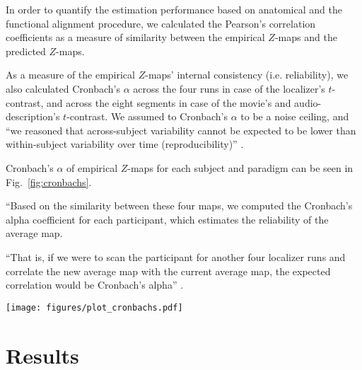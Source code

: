In order to quantify the estimation performance based on anatomical and the
functional alignment procedure, we calculated the Pearson's correlation
coefficients as a measure of similarity between the empirical $Z$-maps and the
predicted $Z$-maps.

As a measure of the empirical $Z$-maps' internal consistency (i.e.
reliability), we also calculated Cronbach's $\alpha$ across the four runs in
case of the localizer's $t$-contrast, and across the eight segments in case of
the movie's and audio-description's $t$-contrast.
%
We assumed to Cronbach's $\alpha$ to be a noise ceiling, and ``we reasoned that
across-subject variability cannot be expected to be lower than within-subject
variability over time (reproducibility)'' \citep{rosenke2021probabilistic}.


%
Cronbach's $\alpha$ of empirical $Z$-maps for each subject and paradigm
can be seen in Fig.~\ref{fig:cronbachs}.

``Based on the similarity between these four maps, we computed the Cronbach's
alpha coefficient for each participant, which estimates the reliability of the
average map.

%
\citep{feilong2022individualized} ``That is, if we were to scan the participant
for another four localizer runs and correlate the new average map with the
current average map, the expected correlation would be Cronbach's alpha''
\citep{feilong2022individualized}.



\begin{figure*}[tbp] \centering
    \texttt{[image: figures/plot\_cronbachs.pdf]}
    \caption{\textbf{Cronbach's $\alpha$ of the empirical $Z$-maps for each
    paradigm and subject.}
    Cronbach's $\alpha$ was calculated based on the $Z$-maps yielded by the
    first level \ac{glm} analyses of the visual localizer
    \citep{sengupta2016extension} (four runs) and naturalistic stimuli
    \citep{haeusler2022processing} (eight segments each) respectively.
    The second-level \ac{glm} analyses across runs / segments yielded the
    empirical $Z$-maps that were estimated in the present study.
    \textbf{needs legend for medians and means}
    }
    \label{fig:cronbachs}
\end{figure*}


\section{Results}

